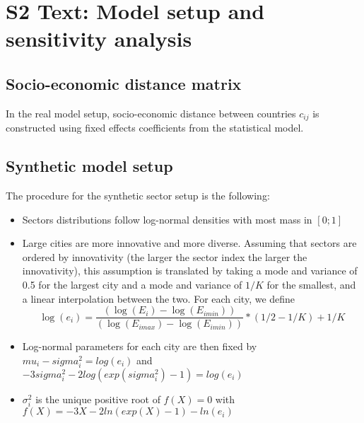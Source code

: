 %
%

\section*{S2 Text: Model setup and sensitivity analysis}


\subsection*{Socio-economic distance matrix}

In the real model setup, socio-economic distance between countries $c_{ij}$ is constructed using fixed effects coefficients from the statistical model. 



\subsection*{Synthetic model setup}

The procedure for the synthetic sector setup is the following:
\begin{itemize}
    \item Sectors distributions follow log-normal densities with most mass in $\left[0;1\right]$
    \item Large cities are more innovative and more diverse. Assuming that sectors are ordered by innovativity (the larger the sector index the larger the innovativity), this assumption is translated by taking a mode and variance of 0.5 for the largest city and a mode and variance of $1/K$ for the smallest, and a linear interpolation between the two. For each city, we define
    \[
    \log(e_i) = \frac{(\log(E_i) - \log(E_{imin}))}{(\log(E_{imax}) - \log(E_{imin}))} * (1/2 - 1/K) + 1/K
    \]
    \item Log-normal parameters for each city are then fixed by $mu_i - sigma_i^2 = log(e_i)$ and $-3 sigma_i^2 - 2 log(exp(sigma_i^2) - 1) = log(e_i)$
    \item $\sigma_i^2$ is the unique positive root of $f(X)=0$ with $f(X) = -3X - 2 ln(exp(X) - 1) - ln(e_i)$
\end{itemize}






